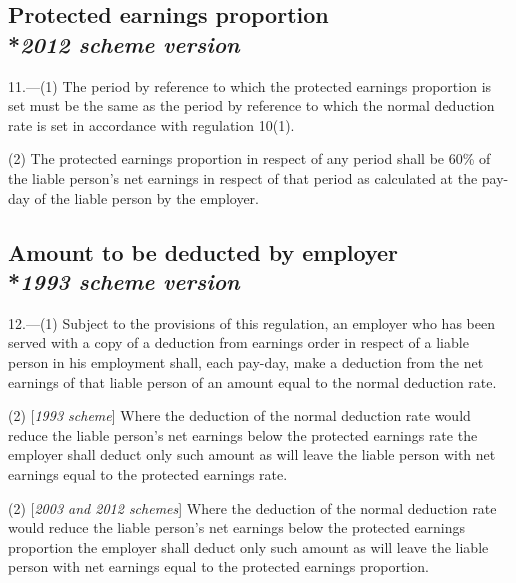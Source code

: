 \documentclass[12pt,a4paper]{article}
\begin{document}
\subsection[11. Protected earnings proportion --- \emph{2012 scheme version}]{Protected earnings proportion\\*\emph{2012 scheme version}}

11.---(1)  The period by reference to which the protected earnings proportion is set must be the same as the period by reference to which the normal deduction rate is set in accordance with regulation 10(1).

(2) The protected earnings proportion in respect of any period shall be 60\% of the liable person’s net earnings in respect of that period as calculated at the pay-day of the liable person by the employer.


\subsection[12. Amount to be deducted by employer --- \emph{1993 scheme version}]{Amount to be deducted by employer\\*\emph{1993 scheme version}}

12.—(1) Subject to the provisions of this regulation, an employer who has been served with a copy of a deduction from earnings order in respect of a liable person in his employment shall, each pay-day, make a deduction from the net earnings of that liable person of an amount equal to the normal deduction rate.

(2) [\emph{1993 scheme}] Where the deduction of the normal deduction rate would reduce the liable person’s net earnings below the protected earnings rate the employer shall deduct only such amount as will leave the liable person with net earnings equal to the protected earnings rate.

(2) [\emph{2003 and 2012 schemes}] Where the deduction of the normal deduction rate would reduce the liable person’s net earnings below the 
protected earnings proportion  %
the employer shall deduct only such amount as will leave the liable person with net earnings equal to the 
protected earnings proportion.  %
\end{document}
